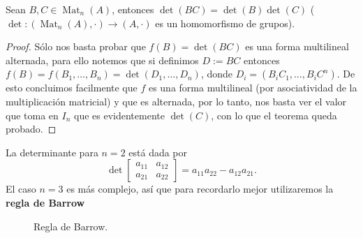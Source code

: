 \documentclass[11pt,oneside]{book}
\DeclareMathOperator{\Mat}{Mat}
\begin{document}
\begin{thm}
Sean $B,C\in\Mat_n(A)$, entonces $\det(BC)=\det(B)\det(C)$ ($\det:(\Mat_n(A),\cdot)\rightarrow(A,\cdot)$ es un homomorfismo de grupos).
\end{thm}
\begin{proof}
Sólo nos basta probar que $f(B)=\det(BC)$ es una forma multilineal alternada, para ello notemos que si definimos $D:=BC$ entonces $f(B)=f(B_1,\dots,B_n)=\det(D_1,\dots,D_n)$, donde $D_i=(B_iC_1,\dots,B_iC^n)$. De esto concluimos facilmente que $f$ es una forma multilineal (por asociatividad de la multiplicación matricial) y que es alternada, por lo tanto, nos basta ver el valor que toma en $I_n$ que es evidentemente $\det(C)$, con lo que el teorema queda probado.
\end{proof}
La determinante para $n=2$ está dada por
\begin{equation}
\det\begin{bmatrix}
a_{11} & a_{12}\\
a_{21} & a_{22}
\end{bmatrix}=a_{11}a_{22}-a_{12}a_{21}.
\end{equation}
El caso $n=3$ es más complejo, así que para recordarlo mejor utilizaremos la \textbf{regla de Barrow}
\begin{figure}
\centering
{}
\caption{Regla de Barrow.}\label{fig:barrow-rule}
\end{figure}
\end{document}
